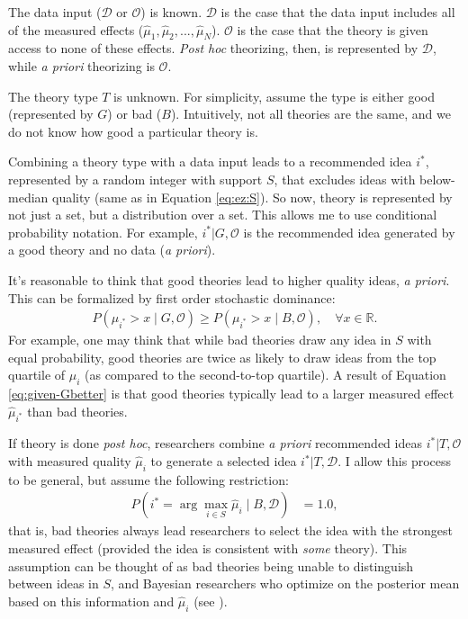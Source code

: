 \documentclass[12pt,english]{article}
\theoremstyle{plain}
\theoremstyle{plain}
\begin{document}
The data input ($\mathcal{D}$ or $\mathcal{O}$) is  known. $\mathcal{D}$ is the case that the data input includes all of the measured effects ($\hat{\mu}_{1},\hat{\mu}_{2},...,\hat{\mu}_{N}$). $\mathcal{O}$ is the case that the theory is given access to none of these effects. \emph{Post hoc} theorizing, then, is represented by $\mathcal{D}$, while \emph{a priori} theorizing is $\mathcal{O}$.

The theory type $T$ is unknown. For simplicity, assume the type is either good (represented by $G$) or bad ($B$). Intuitively, not all theories are the same, and we do not know how good a particular theory is.

Combining a theory type with a data input leads to a recommended idea $i^{\ast}$, represented by a random integer with support $S$, that excludes ideas with below-median quality (same as in Equation \eqref{eq:ez:S}). So now, theory is represented by not just a set, but a distribution over a set. This allows me to use conditional probability notation. For example, $i^{\ast}|G,\mathcal{O}$ is the recommended idea generated by a good theory and no data (\emph{a priori}).

It's reasonable to think that good theories lead to higher quality ideas, \emph{a priori}. This can be formalized by first order stochastic dominance:
\begin{align}
P\left(\mu_{i^{\ast}}>x\mid G,\mathcal{O}\right)
\geq
P\left(\mu_{i^{\ast}}>x\mid B,\mathcal{O}\right),
\quad \forall x\in \mathbb{R}.
\label{eq:given-Gbetter}
\end{align}
For example, one may think that while bad theories draw any idea in $S$ with equal probability, good theories are twice as likely to draw ideas from the top quartile of $\mu_{i}$ (as compared to the second-to-top quartile). A result of Equation \eqref{eq:given-Gbetter} is that  good theories typically lead to a larger measured effect $\hat{\mu}_{i^{\ast}}$ than bad theories.

If theory is done \emph{post hoc}, researchers combine \emph{a priori} recommended ideas $i^{\ast}|T,\mathcal{O}$ with measured quality $\hat{\mu}_{i}$ to generate a selected idea $i^{\ast}|T,\mathcal{D}$. I allow this process to be general, but assume the following restriction:
\begin{align}
P\left(i^{\ast}=\arg\max_{i\in S }\hat{\mu}_{i}\mid B,\mathcal{D}\right) & =1.0,
\label{eq:endo:bad-post-hoc}
\end{align}
that is, bad theories always lead researchers to select the idea with the strongest measured effect (provided the idea is consistent with \emph{some} theory).  This assumption can be thought of as bad theories being unable to distinguish between ideas in $S$, and Bayesian researchers who optimize on the posterior mean based on this information and $\hat{\mu}_{i}$ (see \citealt{chen2025high}). 
\end{document}
